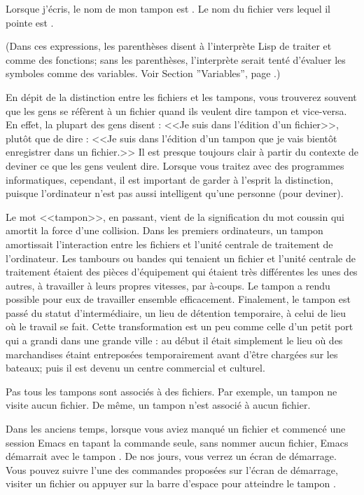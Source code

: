Lorsque j'écris, le nom de mon tampon est
. Le nom du fichier vers lequel il pointe
est .

(Dans ces expressions, les parenthèses disent à l'interprète Lisp de
traiter  et  comme des fonctions;
sans les parenthèses, l'interprète serait tenté d'évaluer les symboles
comme des variables. Voir Section  ''Variables'', page
.) 

En dépit de la distinction entre les fichiers et les tampons, vous
trouverez souvent que les gens se réfèrent à un fichier quand ils
veulent dire tampon et vice-versa. En effet, la plupart des gens
disent : <<Je suis dans l'édition d'un fichier>>, plutôt que de dire :
<<Je suis dans l'édition d'un tampon que je vais bientôt enregistrer
dans un fichier.>> Il est presque toujours clair à partir du contexte
de deviner ce que les gens veulent dire. Lorsque vous traitez avec des
programmes informatiques, cependant, il est important de garder à
l'esprit la distinction, puisque l'ordinateur n'est pas aussi
intelligent qu'une personne (pour deviner).

Le mot <<tampon>>, en passant, vient de la signification du mot
coussin qui amortit la force d'une collision. Dans les premiers
ordinateurs, un tampon amortissait l'interaction entre les fichiers et
l'unité centrale de traitement de l'ordinateur. Les tambours ou bandes
qui tenaient un fichier et l'unité centrale de traitement étaient des
pièces d'équipement qui étaient très différentes les unes des autres,
à travailler à leurs propres vitesses, par à-coups. Le tampon a rendu
possible pour eux de travailler ensemble efficacement. Finalement, le
tampon est passé du statut d'intermédiaire, un lieu de détention
temporaire, à celui de lieu où le travail se fait. Cette
transformation est un peu comme celle d'un petit port qui a grandi
dans une grande ville : au début il était simplement le lieu où des
marchandises étaint entreposées temporairement avant d'être chargées
sur les bateaux; puis il est devenu un centre commercial et culturel. 

Pas tous les tampons sont associés à des fichiers. Par exemple, un
tampon  ne visite aucun fichier. De même, un tampon
 n'est associé à aucun fichier. 

Dans les anciens temps, lorsque vous aviez manqué un fichier
 et commencé une session Emacs en tapant la commande
 seule, sans nommer aucun fichier, Emacs démarrait avec le
tampon . De nos jours, vous verrez un écran de
démarrage. Vous pouvez suivre l'une des commandes proposées sur
l'écran de démarrage, visiter un fichier ou appuyer sur la barre
d'espace pour atteindre le tampon .

